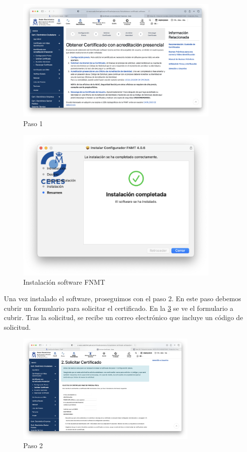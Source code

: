 \begin{figure}[H]
    \centering
    \includegraphics[width=0.9\textwidth]{paso1_ej5a.png}
    \caption{Paso 1}
    \label{fig:paso1}
\end{figure}

\begin{figure}[H]
    \centering
    \includegraphics[width=0.9\textwidth]{instalacion_FNMT_ej5a.png}
    \caption{Instalación software FNMT}
    \label{fig:instalacion_FNMT}
\end{figure}

Una vez instalado el software, proseguimos con el paso 2. En este paso debemos cubrir un formulario para solicitar el certificado. En la \ref{fig:paso2} se ve el formulario a cubrir. Tras la solicitud, se recibe un correo electrónico que incluye un código de solicitud.

\begin{figure}[H]
    \centering
    \includegraphics[width=0.8\textwidth]{paso2_ej5a.png}
    \caption{Paso 2}
    \label{fig:paso2}
\end{figure}

